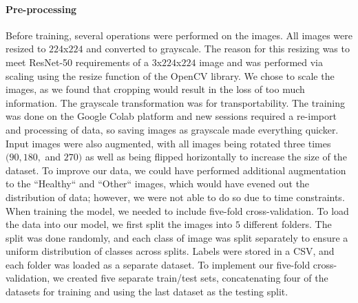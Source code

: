 \documentclass[11pt]{article}
\begin{document}
\paragraph{\noindent\textbf{\LARGE{Pre-processing}}}
\begin{flushleft}
    Before training, several operations were performed on the images. 
    All images were resized to $224$x$224$ and converted to grayscale. 
    The reason for this resizing was to meet ResNet-50 requirements of a $3$x$224$x$224$
    image and was performed via scaling using the resize function of the OpenCV 
    library. 
    \newline
    \newline
    We chose to scale the images, as we found that cropping would result
    in the loss of too much information. The grayscale transformation was for 
    transportability. The training was done on the Google Colab platform and 
    new sessions required a re-import and processing of data, so saving images as 
    grayscale made everything quicker. 
    \newline
    \newline
    Input images were also augmented, with all images being rotated three times 
    $(90, 180, $ and $270)$ as well as being flipped horizontally to increase 
    the size of the dataset. 
    \newline
    \newline
    To improve our data, we could have performed additional augmentation to the 
    ``Healthy`` and  ``Other`` images, which would have evened out the distribution 
    of data; however, we were not able to do so due to time constraints.
    \newline
    \newline
    When training the model, we needed to include five-fold cross-validation. 
    To load the data into our model, we first split the images into $5$ different 
    folders. The split was done randomly, and each class of image was split separately 
    to ensure a uniform distribution of classes across splits. Labels were stored 
    in a CSV, and each folder was loaded as a separate dataset. 
    \newline
    \newline
    To implement our five-fold cross-validation, we created five separate train/test 
    sets, concatenating four of the datasets for training and using the last dataset
    as the testing split.  
    \newline
    \newline    

\end{flushleft}
\end{document}

